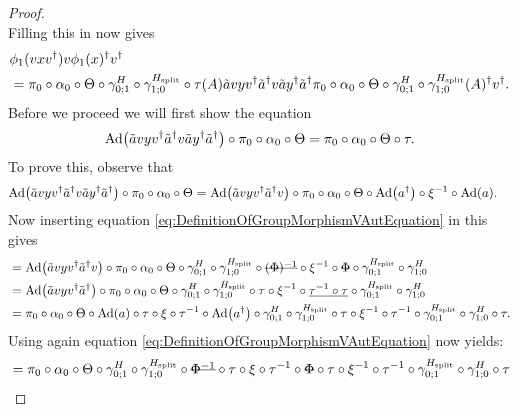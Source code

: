 \documentclass[11pt,a4paper,twoside]{article}
\numberwithin{equation}{section}
\begin{document}
\begin{proof}
\begin{equation}
		\end{equation}
		Filling this in now gives
		\begin{align}
			&\phi_1(vxv^\dagger)v\phi_1(x)^\dagger v^\dagger\\
			\label{eq:lem:phi1phi2matchingCondition:Proof_v_Part1Appendix}
			&=\pi_0\circ\alpha_0\circ\Theta\circ\gamma^{H}_{0;1}\circ\gamma^{{H_{\text{split}}}}_{1;0}\circ\tau(A)\tilde{a}vyv^\dagger\tilde{a}^\dagger v \tilde{a}y^\dagger\tilde{a}^\dagger \pi_0\circ\alpha_0\circ\Theta\circ\gamma^{H}_{0;1}\circ\gamma^{{H_{\text{split}}}}_{1;0}(A)^\dagger v^\dagger.
		\end{align}
		Before we proceed we will first show the equation
		\begin{equation}\label{eq:lem:phi1phi2matchingCondition:Proof_v_Part2Appendix}
			\Ad{\tilde{a}vyv^\dagger\tilde{a}^\dagger v\tilde{a}y^\dagger\tilde{a}^\dagger}\circ\pi_0\circ\alpha_0\circ\Theta=\pi_0\circ\alpha_0\circ\Theta\circ\tau.
		\end{equation}
		To prove this, observe that
		\begin{align}
			&\Ad{\tilde{a}vyv^\dagger\tilde{a}^\dagger v\tilde{a}y^\dagger\tilde{a}^\dagger}\circ\pi_0\circ\alpha_0\circ\Theta=\Ad{\tilde{a}vyv^\dagger\tilde{a}^\dagger v}\circ\pi_0\circ\alpha_0\circ\Theta\circ\Ad{a^\dagger}\circ\xi^{-1}\circ\Ad{a}.
		\end{align}
		Now inserting equation \eqref{eq:DefinitionOfGroupMorphismVAutEquation} in this gives
		\begin{align}
			&=\Ad{\tilde{a}vyv^\dagger\tilde{a}^\dagger v}\circ\pi_0\circ\alpha_0\circ\Theta\circ\gamma^{H}_{0;1}\circ\gamma^{\Hsplit}_{1;0}\circ\stkout{(\Phi)^{-1}}\circ\xi^{-1}\circ\stkout{\Phi}\circ\gamma^{\Hsplit}_{0;1}\circ\gamma^H_{1;0}\\
			&=\Ad{\tilde{a}vyv^\dagger\tilde{a}^\dagger }\circ\pi_0\circ\alpha_0\circ\Theta\circ\gamma^{H}_{0;1}\circ\gamma^{\Hsplit}_{1;0}\circ\tau\circ\xi^{-1}\circ\underline{\tau^{-1}\circ\tau}\circ\gamma^{\Hsplit}_{0;1}\circ\gamma^H_{1;0}\\
			&=\pi_0\circ\alpha_0\circ\Theta\circ\Ad{a}\circ\tau\circ\xi\circ\tau^{-1}\circ\Ad{a^\dagger}\circ\gamma^{H}_{0;1}\circ\gamma^{\Hsplit}_{1;0}\circ\tau\circ\xi^{-1}\circ\tau^{-1}\circ\gamma^{\Hsplit}_{0;1}\circ\gamma^H_{1;0}\circ\tau.
		\end{align}
		Using again equation \eqref{eq:DefinitionOfGroupMorphismVAutEquation} now yields:
		\begin{align}
			&=\pi_0\circ\alpha_0\circ\Theta\circ\gamma^{H}_{0;1}\circ\gamma^{\Hsplit}_{1;0}\circ\stkout{\Phi^{-1}}\circ\tau\circ\xi\circ\tau^{-1}\circ\stkout{\Phi}\circ\tau\circ\xi^{-1}\circ\tau^{-1}\circ\gamma^{\Hsplit}_{0;1}\circ\gamma^H_{1;0}\circ\tau\\

\end{align}
\end{proof}
\end{document}
